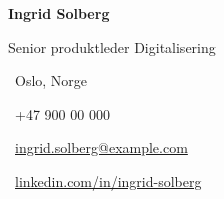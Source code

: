 \documentclass[10pt,a4paper]{article}
\begin{document}
\begin{tcolorbox}[
  colback=navy,
  colframe=navy,
  boxrule=0pt,
  arc=3pt,
  left=12pt,right=12pt,top=9pt,bottom=9pt
]
  \begin{minipage}[c]{0.54\linewidth}
    {\color{white}\fontsize{24}{27}\selectfont\bfseries Ingrid Solberg}\par
    \vspace{2pt}
    {\color{white!78}\large Senior produktleder \textbar{} Digitalisering}
  \end{minipage}%
  \hfill
  \begin{minipage}[c]{0.41\linewidth}
    \raggedleft\color{white}
    {\small
      \faMapMarker*\ Oslo, Norge\par
      \faPhone*\ +47 900 00 000\par
      \faEnvelope\ \href{mailto:ingrid.solberg@example.com}{\color{white}ingrid.solberg@example.com}\par
      \faLinkedin\ \href{https://www.linkedin.com/in/ingrid-solberg}{\color{white}linkedin.com/in/ingrid-solberg}
    }
  \end{minipage}
\end{tcolorbox}

\vspace{4pt}
\end{document}
